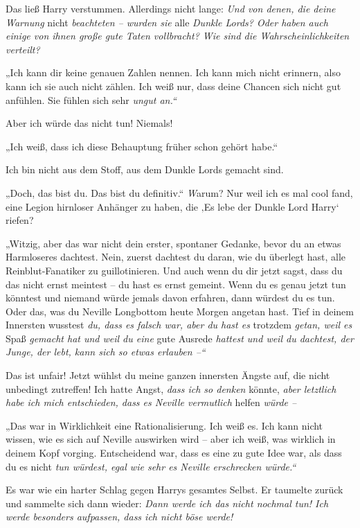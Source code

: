 {Das ließ Harry verstummen. Allerdings nicht lange: \emph{Und von denen, die deine Warnung} nicht \emph{beachteten -- wurden sie} alle \emph{Dunkle Lords? Oder haben auch einige von ihnen große gute Taten vollbracht? Wie sind die Wahrscheinlichkeiten verteilt?}

„Ich kann dir keine genauen Zahlen nennen. Ich kann mich nicht erinnern, also kann ich sie auch nicht zählen. Ich weiß nur, dass deine Chancen sich nicht gut anfühlen. Sie fühlen sich sehr \emph{ungut an.“}

Aber ich würde das nicht tun! Niemals!

„Ich weiß, dass ich diese Behauptung früher schon gehört habe.“

Ich bin nicht aus dem Stoff, aus dem Dunkle Lords gemacht sind.

„Doch, das bist du. Das bist du definitiv.“ \emph

Warum? Nur weil ich es mal cool fand, eine Legion hirnloser Anhänger zu haben, die ‚Es lebe der Dunkle Lord Harry` riefen?

„Witzig, aber das war nicht dein erster, spontaner Gedanke, bevor du an etwas Harmloseres dachtest. Nein, zuerst dachtest du daran, wie du überlegt hast, alle Reinblut-Fanatiker zu guillotinieren. Und auch wenn du dir jetzt sagst, dass du das nicht ernst meintest -- du hast es ernst gemeint. Wenn du es genau jetzt tun könntest und niemand würde jemals davon erfahren, dann würdest du es tun. Oder das, was du Neville Longbottom heute Morgen angetan hast. Tief in deinem Innersten wusstest \emph{du, dass es falsch war, aber du hast es} trotzdem \emph{getan, weil es} Spaß \emph{gemacht hat und weil du eine} gute Ausrede \emph{hattest und weil du dachtest, der Junge, der lebt, kann sich so etwas erlauben --“}

Das ist unfair! Jetzt wühlst du meine ganzen innersten Ängste auf, die nicht unbedingt zutreffen! Ich hatte Angst, \emph{dass ich so denken} könnte, \emph{aber letztlich habe ich mich entschieden, dass es Neville vermutlich} helfen \emph{würde --}

„Das war in Wirklichkeit eine Rationalisierung. Ich weiß es. Ich kann nicht wissen, wie es sich auf Neville auswirken wird -- aber ich weiß, was wirklich in deinem Kopf vorging. Entscheidend war, dass es eine zu gute Idee war, als dass du es nicht \emph{tun würdest, egal wie sehr es Neville erschrecken würde.“}

Es war wie ein harter Schlag gegen Harrys gesamtes Selbst. Er taumelte zurück und sammelte sich dann wieder: \emph{Dann werde ich das nicht nochmal tun! Ich werde besonders aufpassen, dass ich nicht böse werde!}

}
